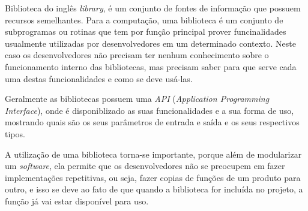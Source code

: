 Biblioteca do inglês \emph{library}, é um conjunto de fontes de informação que possuem recursos
semelhantes. Para a computação, uma biblioteca é um conjunto de subprogramas ou
rotinas que tem por função principal prover funcinalidades usualmente utilizadas por
desenvolvedores em um determinado contexto. Neste caso os desenvolvedores não precisam ter
nenhum conhecimento sobre o funcionamento interno das bibliotecas, mas precisam saber para que
serve cada uma destas funcionalidades e como se deve usá-las.

Geralmente as bibliotecas possuem uma \emph{API} (\emph{Application Programming Interface}), onde
é disponiblizado as suas funcionalidades e a sua forma de uso, mostrando quais são os seus
parâmetros de entrada e saída e os seus respectivos tipos.

A utilização de uma biblioteca torna-se importante, porque além de modularizar um \emph{software}, ela
permite que os desenvolvedores não se preocupem em fazer implementações repetitivas, ou seja, fazer
copias de funções de um produto para outro, e isso se deve ao fato de que quando a biblioteca for
incluída no projeto, a função já vai estar disponível para uso.